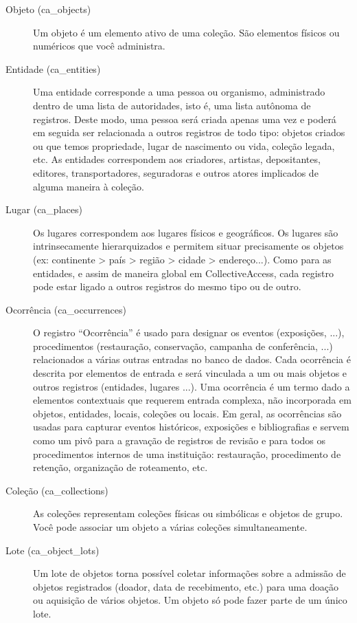 \begin{description}
	\item[Objeto (ca\_objects)] Um objeto é um elemento ativo de uma coleção. São elementos físicos ou numéricos que você administra.
	\item[Entidade (ca\_entities)] Uma entidade corresponde a uma pessoa ou organismo, administrado dentro de uma lista de autoridades, isto é, uma lista autônoma de registros. Deste modo, uma pessoa será criada apenas uma vez e poderá em seguida ser relacionada a outros registros de todo tipo: objetos criados ou que temos propriedade, lugar de nascimento ou vida, coleção legada, etc.  As entidades correspondem aos criadores, artistas, depositantes, editores, transportadores, seguradoras e outros atores implicados de alguma maneira à coleção.
	\item[Lugar (ca\_places)] Os lugares correspondem aos lugares físicos e geográficos. Os lugares são intrinsecamente hierarquizados e permitem situar precisamente os objetos (ex: continente > país > região > cidade > endereço...). Como para as entidades, e assim de maneira global em CollectiveAccess, cada registro pode estar ligado a outros registros do mesmo tipo ou de outro. 
	\item[Ocorrência (ca\_occurrences)] O registro ``Ocorrência'' é usado para designar os eventos (exposições, ...), procedimentos (restauração, conservação, campanha de conferência, ...) relacionados a várias outras entradas no banco de dados. Cada ocorrência é descrita por elementos de entrada e será vinculada a um ou mais objetos e outros registros (entidades, lugares ...). Uma ocorrência é um termo dado a elementos contextuais que requerem entrada complexa, não incorporada em objetos, entidades, locais, coleções ou locais.	Em geral, as ocorrências são usadas para capturar eventos históricos, exposições e bibliografias e servem como um pivô para a gravação de registros de revisão e para todos os procedimentos internos de uma instituição: restauração, procedimento de retenção, organização de roteamento, etc.
	\item[Coleção (ca\_collections)] As coleções representam coleções físicas ou simbólicas e objetos de grupo. Você pode associar um objeto a várias coleções simultaneamente.
	\item[Lote (ca\_object\_lots)] Um lote de objetos torna possível coletar informações sobre a admissão de objetos registrados (doador, data de recebimento, etc.) para uma doação ou aquisição de vários objetos.	Um objeto só pode fazer parte de um único lote.

\end{description}
